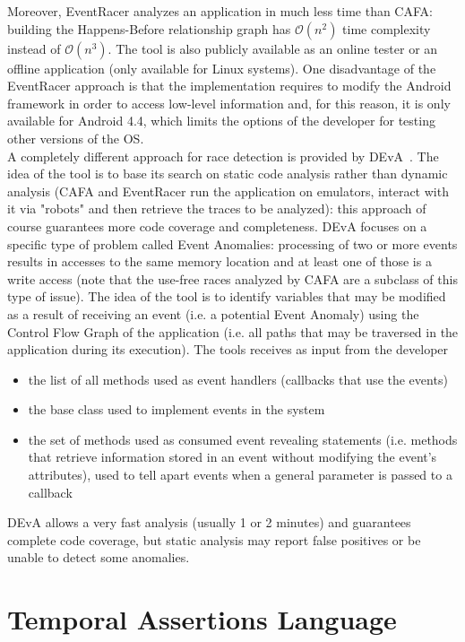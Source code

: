\documentclass[11pt,a4paper,notitlepage]{article}
\begin{document}
Moreover, EventRacer analyzes an application in much less time than CAFA: building the Happens-Before relationship graph has $\mathcal{O}(n^2)$ time complexity instead of $\mathcal{O}(n^3)$. The tool is also publicly available as an online tester or an offline application (only available for Linux systems). One disadvantage of the EventRacer approach is that the implementation requires to modify the Android framework in order to access low-level information and, for this reason, it is only available for Android 4.4, which limits the options of the developer for testing other versions of the OS.\bigskip \\
A completely different approach for race detection is provided by DEvA~\cite{Safi:2015:DEA:2786805.2786836}. The idea of the tool is to base its search on static code analysis rather than dynamic analysis (CAFA and EventRacer run the application on emulators, interact with it via "robots" and then retrieve the traces to be analyzed): this approach of course guarantees more code coverage and completeness. DEvA focuses on a specific type of problem called Event Anomalies: processing of two or more events results in accesses to the same memory location and at least one of those is a write access (note that the use-free races analyzed by CAFA are a subclass of this type of issue). The idea of the tool is to identify variables that may be modified as a result of receiving an event (i.e. a potential Event Anomaly) using the Control Flow Graph of the application (i.e. all paths that may be traversed in the application during its execution). The tools receives as input from the developer
\begin{itemize}
	\item the list of all methods used as event handlers (callbacks that use the events)
	\item the base class used to implement events in the system
	\item the set of methods used as consumed event revealing statements (i.e. methods that retrieve information stored in an event without modifying the event's attributes), used to tell apart events when a general parameter is passed to a callback
\end{itemize}
DEvA allows a very fast analysis (usually 1 or 2 minutes) and guarantees complete code coverage, but static analysis may report false positives or be unable to detect some anomalies.

\section{Temporal Assertions Language}
\end{document}
